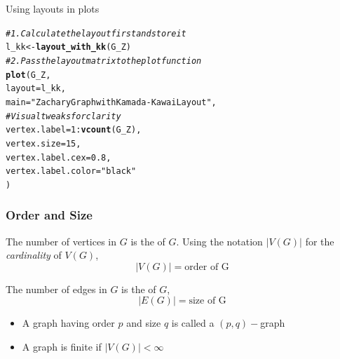 \documentclass[aspectratio=169]{beamer}\usepackage[]{graphicx}\usepackage[]{xcolor}
\makeatletter
\newcommand{\hlnum}[1]{\textcolor[rgb]{0.686,0.059,0.569}{#1}}%
\newcommand{\hlsng}[1]{\textcolor[rgb]{0.192,0.494,0.8}{#1}}%
\newcommand{\hlcom}[1]{\textcolor[rgb]{0.678,0.584,0.686}{\textit{#1}}}%
\newcommand{\hlopt}[1]{\textcolor[rgb]{0,0,0}{#1}}%
\newcommand{\hldef}[1]{\textcolor[rgb]{0.345,0.345,0.345}{#1}}%
\newcommand{\hlkwb}[1]{\textcolor[rgb]{0.69,0.353,0.396}{#1}}%
\newcommand{\hlkwc}[1]{\textcolor[rgb]{0.333,0.667,0.333}{#1}}%
\newcommand{\hlkwd}[1]{\textcolor[rgb]{0.737,0.353,0.396}{\textbf{#1}}}%
\newenvironment{kframe}{%
 \def\at@end@of@kframe{}%
 \ifinner\ifhmode%
  \def\at@end@of@kframe{\end{minipage}}%
  \begin{minipage}{\columnwidth}%
 \fi\fi%
 \def\FrameCommand##1{\hskip\@totalleftmargin \hskip-\fboxsep
 \colorbox{shadecolor}{##1}\hskip-\fboxsep
     \hskip-\linewidth \hskip-\@totalleftmargin \hskip\columnwidth}%
 \MakeFramed {\advance\hsize-\width
   \@totalleftmargin\z@ \linewidth\hsize
   \@setminipage}}%
 {\par\unskip\endMakeFramed%
 \at@end@of@kframe}
\newenvironment{knitrout}{}{} %
\makeatother
\begin{document}
\begin{frame}[fragile]{Using layouts in  plots}
\begin{knitrout}
\color{fgcolor}\begin{kframe}
\begin{alltt}
\hlcom{# 1. Calculate the layout first and store it}
\hldef{l_kk} \hlkwb{<-} \hlkwd{layout_with_kk}\hldef{(G_Z)}
\hlcom{# 2. Pass the layout matrix to the plot function}
\hlkwd{plot}\hldef{(G_Z,}
     \hlkwc{layout} \hldef{= l_kk,}
     \hlkwc{main} \hldef{=} \hlsng{"Zachary Graph with Kamada-Kawai Layout"}\hldef{,}
     \hlcom{# Visual tweaks for clarity}
     \hlkwc{vertex.label} \hldef{=} \hlnum{1}\hlopt{:}\hlkwd{vcount}\hldef{(G_Z),}
     \hlkwc{vertex.size} \hldef{=} \hlnum{15}\hldef{,}
     \hlkwc{vertex.label.cex} \hldef{=} \hlnum{0.8}\hldef{,}
     \hlkwc{vertex.label.color} \hldef{=} \hlsng{"black"}
\hldef{)}
\end{alltt}
\end{kframe}
\end{knitrout}
\end{frame}



\begin{frame}\frametitle{Order and Size}
	\begin{definition}
	The number of vertices in $G$ is the  of $G$. Using the notation $|V(G)|$ for the \emph{cardinality} of $V(G)$,
	$$|V(G)|=\textrm{order of G}$$
	\end{definition}
	\vfill
	\begin{definition}
	The number of edges in $G$ is the  of $G$,
	$$|E(G)|=\textrm{size of G}$$
	\end{definition}
	\vfill
	\begin{itemize}
	\item A graph having order $p$ and size $q$ is called a $(p,q)-$graph
	\item A graph is finite if $|V(G)|<\infty$
	\end{itemize}
\end{frame}
\end{document}
